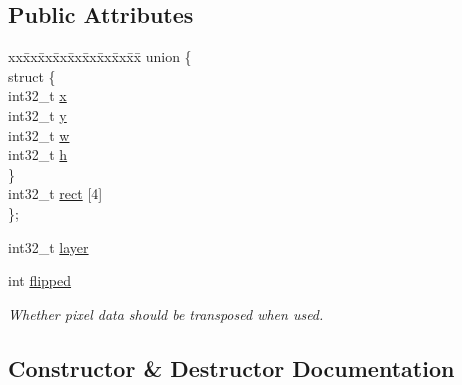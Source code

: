 \subsection*{Public Attributes}
\begin{DoxyCompactItemize}
\item 
\begin{tabbing}
xx\=xx\=xx\=xx\=xx\=xx\=xx\=xx\=xx\=\kill
union \{\\
\>struct \{\\
\>\>int32\_t \hyperlink{structpixel_1_1graphics_1_1_texture_region_a5e5ae4be563334f295368f2487e264c5}{x}\\
\>\>int32\_t \hyperlink{structpixel_1_1graphics_1_1_texture_region_adc95100decbaac0ccd8ee4df885b822a}{y}\\
\>\>int32\_t \hyperlink{structpixel_1_1graphics_1_1_texture_region_a3808878a4220a8a7a8a590ee8e089310}{w}\\
\>\>int32\_t \hyperlink{structpixel_1_1graphics_1_1_texture_region_ac8da7a932775f6ab00f956d00b4599ac}{h}\\
\>\} \\
\>int32\_t \hyperlink{structpixel_1_1graphics_1_1_texture_region_ae6ae8f0c8f95225e7e977d8f08b0ed05}{rect} \mbox{[}4\mbox{]}\\
\}; \\

\end{tabbing}\item 
int32\+\_\+t \hyperlink{structpixel_1_1graphics_1_1_texture_region_ac17cc15ef453654e9a60bda0501ce2fb}{layer}
\item 
int \hyperlink{structpixel_1_1graphics_1_1_texture_region_abbd4cd9bdb8d5fd6502d80d55dfec2e8}{flipped}
\begin{DoxyCompactList}\small\item\em Whether pixel data should be transposed when used. \end{DoxyCompactList}\end{DoxyCompactItemize}


\subsection{Constructor \& Destructor Documentation}
\mbox{\label{structpixel_1_1graphics_1_1_texture_region_ab35637b13bc025dcc548a2ed5982ee19}} 
